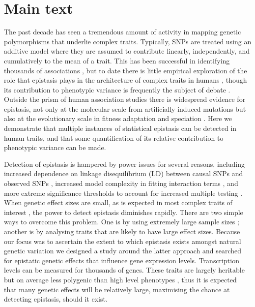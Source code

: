 \documentclass{article}
\begin{document}
\section{Main text}

The past decade has seen a tremendous amount of activity in mapping genetic polymorphisms that underlie complex traits. Typically, SNPs are treated using an additive model where they are assumed to contribute linearly, independently, and cumulatively to the mean of a trait. This has been successful in identifying thousands of associations \cite{Visscher2012}, but to date there is little empirical exploration of the role that epistasis plays in the architecture of complex traits in humans \cite{Strange2010, Evans2011}, though its contribution to phenotypic variance is frequently the subject of debate \cite{Carlborg2004, Hill2008a, Crow2010}. Outside the prism of human association studies there is widespread evidence for epistasis, not only at the molecular scale from artificially induced mutations \cite{Costanzo2010} but also at the evolutionary scale in fitness adaptation \cite{Weinreich2006} and speciation \cite{Breen2012}. Here we demonstrate that multiple instances of statistical epistasis can be detected in human traits, and that some quantification of its relative contribution to phenotypic variance can be made.

Detection of epistasis is hampered by power issues for several reasons, including increased dependence on linkage disequilibrium (LD) between causal SNPs and observed SNPs \cite{Weir2008, Hemani2013}, increased model complexity in fitting interaction terms \cite{Marchini2005}, and more extreme significance thresholds to account for increased multiple testing \cite{Cordell2009}. When genetic effect sizes are small, as is expected in most complex traits of interest \cite{Visscher2012}, the power to detect epistasis diminishes rapidly. There are two simple ways to overcome this problem. One is by using extremely large sample sizes \cite{LangoAllen2010}; another is by analysing traits that are likely to have large effect sizes. Because our focus was to ascertain the extent to which epistasis exists amongst natural genetic variation we designed a study around the latter approach and searched for epistatic genetic effects that influence gene expression levels. Transcription levels can be measured for thousands of genes. These traits are largely heritable but on average less polygenic than high level phenotypes \cite{Powell2013}, thus it is expected that many genetic effects will be relatively large, maximising the chance at detecting epistasis, should it exist.
\end{document}
